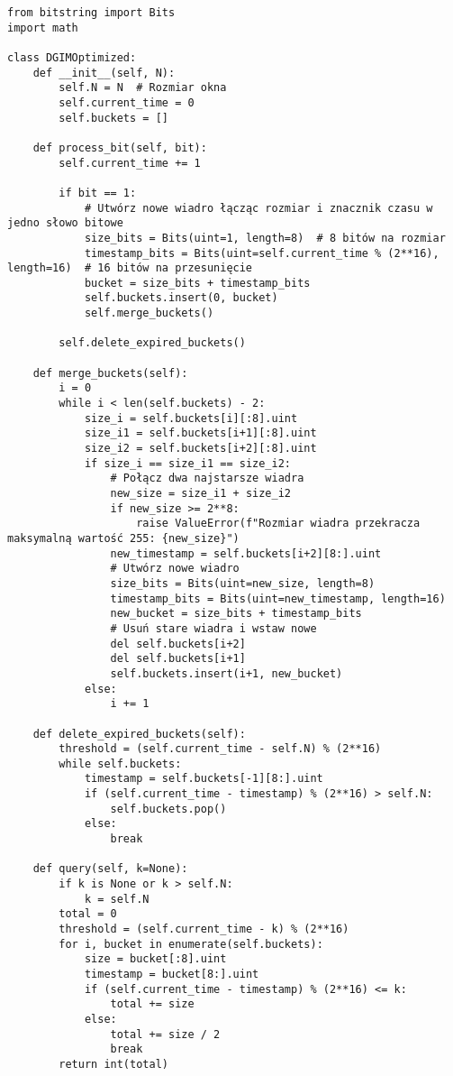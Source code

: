 \documentclass{article}
\begin{document}
\begin{lstlisting}[style=pystyle, caption=Zoptymalizowana implementacja algorytmu DGIM]
from bitstring import Bits
import math

class DGIMOptimized:
    def __init__(self, N):
        self.N = N  # Rozmiar okna
        self.current_time = 0
        self.buckets = []

    def process_bit(self, bit):
        self.current_time += 1

        if bit == 1:
            # Utwórz nowe wiadro łącząc rozmiar i znacznik czasu w jedno słowo bitowe
            size_bits = Bits(uint=1, length=8)  # 8 bitów na rozmiar
            timestamp_bits = Bits(uint=self.current_time % (2**16), length=16)  # 16 bitów na przesunięcie
            bucket = size_bits + timestamp_bits
            self.buckets.insert(0, bucket)
            self.merge_buckets()

        self.delete_expired_buckets()

    def merge_buckets(self):
        i = 0
        while i < len(self.buckets) - 2:
            size_i = self.buckets[i][:8].uint
            size_i1 = self.buckets[i+1][:8].uint
            size_i2 = self.buckets[i+2][:8].uint
            if size_i == size_i1 == size_i2:
                # Połącz dwa najstarsze wiadra
                new_size = size_i1 + size_i2
                if new_size >= 2**8:
                    raise ValueError(f"Rozmiar wiadra przekracza maksymalną wartość 255: {new_size}")
                new_timestamp = self.buckets[i+2][8:].uint
                # Utwórz nowe wiadro
                size_bits = Bits(uint=new_size, length=8)
                timestamp_bits = Bits(uint=new_timestamp, length=16)
                new_bucket = size_bits + timestamp_bits
                # Usuń stare wiadra i wstaw nowe
                del self.buckets[i+2]
                del self.buckets[i+1]
                self.buckets.insert(i+1, new_bucket)
            else:
                i += 1

    def delete_expired_buckets(self):
        threshold = (self.current_time - self.N) % (2**16)
        while self.buckets:
            timestamp = self.buckets[-1][8:].uint
            if (self.current_time - timestamp) % (2**16) > self.N:
                self.buckets.pop()
            else:
                break

    def query(self, k=None):
        if k is None or k > self.N:
            k = self.N
        total = 0
        threshold = (self.current_time - k) % (2**16)
        for i, bucket in enumerate(self.buckets):
            size = bucket[:8].uint
            timestamp = bucket[8:].uint
            if (self.current_time - timestamp) % (2**16) <= k:
                total += size
            else:
                total += size / 2
                break
        return int(total)
\end{lstlisting}
\end{document}
